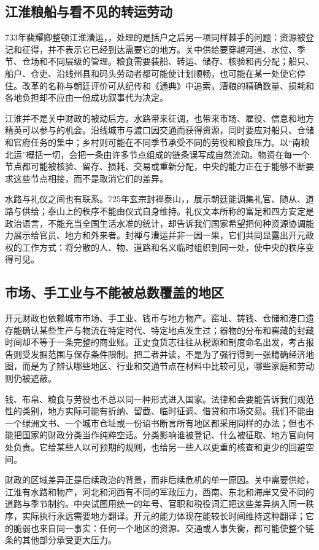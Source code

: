 \subsection{江淮粮船与看不见的转运劳动}
733年裴耀卿整顿江淮漕运，，处理的是括户之后另一项同样棘手的问题：资源被登记和征得，并不表示它已经到达需要它的地方。关中供给要穿越河道、水位、季节、仓场和不同层级的管理。粮食需要装船、转运、储存、核验和再分配；船只、船户、仓吏、沿线州县和码头劳动者都可能使计划顺畅，也可能在某一处使它停住。改革的名称与朝廷评价可从纪传和《通典》中追索，漕粮的精确数量、损耗和各地负担却不应由一份成功叙事代为决定。

江淮并不是关中财政的被动后方。水路带来征调，也带来市场、雇役、信息和地方精英可以参与的机会。沿线城市与渡口因交通而获得资源，同时要应对船只、仓储和官府任务的集中；乡村则可能在不同季节承受不同的劳役和粮食压力。以“南粮北运”概括一切，会把一条由许多节点组成的链条误写成自然流动。物资在每一个节点都可能被核验、留存、损耗、交易或重新分配，中央的能力正在于能够不断要求这些节点相接，而不是取消它们的差异。

水路与礼仪之间也有联系。725年玄宗封禅泰山，，展示朝廷能调集礼官、随从、道路与供给；泰山上的秩序不能由仪式自身维持。礼仪文本所称的富足和四方安定是政治语言，不能充当全国生活水准的统计，却告诉我们国家希望把何种资源协调能力展示给官员、地方和外来者。封禅与漕运并非一因一果，它们共同显露出开元政权的工作方式：将分散的人、物、道路和名义临时组织到同一处，使中央的秩序变得可见。

\subsection{市场、手工业与不能被总数覆盖的地区}
开元财政也依赖城市市场、手工业、钱币与地方物产。窑址、铸钱、仓储和港口遗存能确认某些生产与物流在特定时代、特定地点发生过；器物的分布和窖藏的封藏时间却不等于一条完整的商业账。正史食货志往往从税源和制度命名出发，考古报告则受发掘范围与保存条件限制。把二者并读，不是为了强行得到一张精确经济地图，而是为了辨认哪些地区、行业和交通节点在材料中比较可见，哪些家庭和劳动则仍被遮蔽。

钱、布帛、粮食与劳役也不总以同一种形式进入国家。法律和会要能告诉我们规范性的类别，地方实际可能有折纳、留截、临时征调、借贷和市场交易。我们不能由一个绿洲文书、一个城市仓址或一份诏书断言所有地区都采用同样的办法；但也不能把国家的财政分类当作纯粹空话。分类影响谁被登记、什么被征取、地方官向何处负责。它给某些人以可预期的规则，也给另一些人以更重的核查和更少的回避空间。

财政的区域差异正是后续政治的背景，而非后续危机的单一原因。关中需要供给，江淮有水路和物产，河北和河西有不同的军政压力，西南、东北和海岸又受不同的道路与季节制约。中央试图用统一的年号、官职和税役词汇把这些差异纳入同一秩序，实际执行永远需要地方翻译。开元的能力体现在能较长时间维持这种翻译；它的脆弱也来自同一事实：任何一个地区的资源、交通或人事失衡，都可能使整个链条的其他部分承受更大压力。

